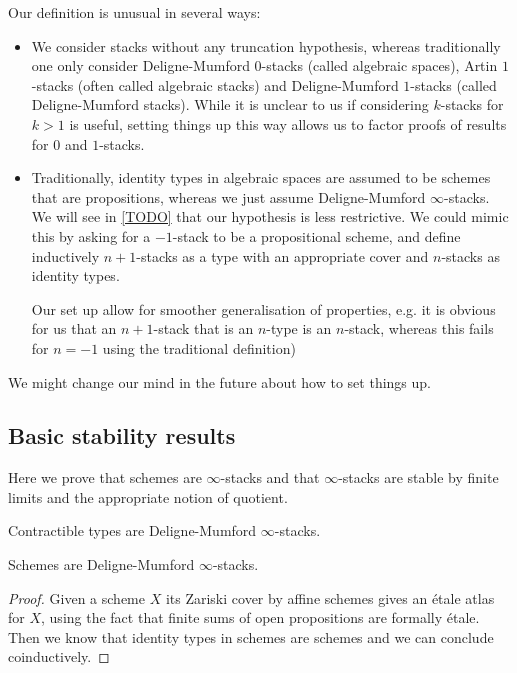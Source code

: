 \begin{remark}
Our definition is unusual in several ways:
\begin{itemize}
\item We consider stacks without any truncation hypothesis, whereas traditionally one only consider Deligne-Mumford $0$-stacks (called algebraic spaces), Artin $1$-stacks (often called algebraic stacks) and Deligne-Mumford $1$-stacks (called Deligne-Mumford stacks). While it is unclear to us if considering $k$-stacks for $k>1$ is useful, setting things up this way allows us to factor proofs of results for $0$ and $1$-stacks.
\item Traditionally, identity types in algebraic spaces are assumed to be schemes that are propositions, whereas we just assume Deligne-Mumford $\infty$-stacks. We will see in \cref{TODO} that our hypothesis is less restrictive. We could mimic this by asking for a $-1$-stack to be a propositional scheme, and define inductively $n+1$-stacks as a type with an appropriate cover and $n$-stacks as identity types.

Our set up allow for smoother generalisation of properties, e.g. it is obvious for us that an $n+1$-stack that is an $n$-type is an $n$-stack, whereas this fails for $n=-1$ using the traditional definition)
\end{itemize}
We might change our mind in the future about how to set things up.
\end{remark}

\subsection{Basic stability results}

Here we prove that schemes are $\infty$-stacks and that $\infty$-stacks are stable by finite limits and the appropriate notion of quotient.

\begin{remark}
Contractible types are Deligne-Mumford $\infty$-stacks.
\end{remark}

\begin{lemma}
Schemes are Deligne-Mumford $\infty$-stacks.
\end{lemma}

\begin{proof}
Given a scheme $X$ its Zariski cover by affine schemes gives an étale atlas for $X$, using the fact that finite sums of open propositions are formally étale. Then we know that identity types in schemes are schemes and we can conclude coinductively.
\end{proof}

